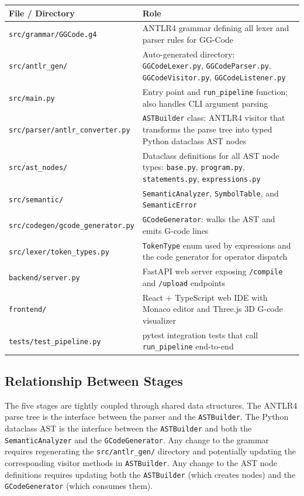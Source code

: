 \begin{center}
\begin{tabular}{|l|p{9cm}|}
\hline
\textbf{File / Directory} & \textbf{Role} \\
\hline
\texttt{src/grammar/GGCode.g4} & ANTLR4 grammar defining all lexer and parser rules for GG-Code \\
\hline
\texttt{src/antlr\_gen/} & Auto-generated directory: \texttt{GGCodeLexer.py}, \texttt{GGCodeParser.py}, \texttt{GGCodeVisitor.py}, \texttt{GGCodeListener.py} \\
\hline
\texttt{src/main.py} & Entry point and \texttt{run\_pipeline} function; also handles CLI argument parsing \\
\hline
\texttt{src/parser/antlr\_converter.py} & \texttt{ASTBuilder} class: ANTLR4 visitor that transforms the parse tree into typed Python dataclass AST nodes \\
\hline
\texttt{src/ast\_nodes/} & Dataclass definitions for all AST node types: \texttt{base.py}, \texttt{program.py}, \texttt{statements.py}, \texttt{expressions.py} \\
\hline
\texttt{src/semantic/} & \texttt{SemanticAnalyzer}, \texttt{SymbolTable}, and \texttt{SemanticError} \\
\hline
\texttt{src/codegen/gcode\_generator.py} & \texttt{GCodeGenerator}: walks the AST and emits G-code lines \\
\hline
\texttt{src/lexer/token\_types.py} & \texttt{TokenType} enum used by expressions and the code generator for operator dispatch \\
\hline
\texttt{backend/server.py} & FastAPI web server exposing \texttt{/compile} and \texttt{/upload} endpoints \\
\hline
\texttt{frontend/} & React + TypeScript web IDE with Monaco editor and Three.js 3D G-code visualizer \\
\hline
\texttt{tests/test\_pipeline.py} & pytest integration tests that call \texttt{run\_pipeline} end-to-end \\
\hline
\end{tabular}
\end{center}

\subsection*{Relationship Between Stages}

The five stages are tightly coupled through shared data structures. The ANTLR4 parse tree is the interface between the parser and the \texttt{ASTBuilder}. The Python dataclass AST is the interface between the \texttt{ASTBuilder} and both the \texttt{SemanticAnalyzer} and the \texttt{GCodeGenerator}. Any change to the grammar requires regenerating the \texttt{src/antlr\_gen/} directory and potentially updating the corresponding visitor methods in \texttt{ASTBuilder}. Any change to the AST node definitions requires updating both the \texttt{ASTBuilder} (which creates nodes) and the \texttt{GCodeGenerator} (which consumes them).


